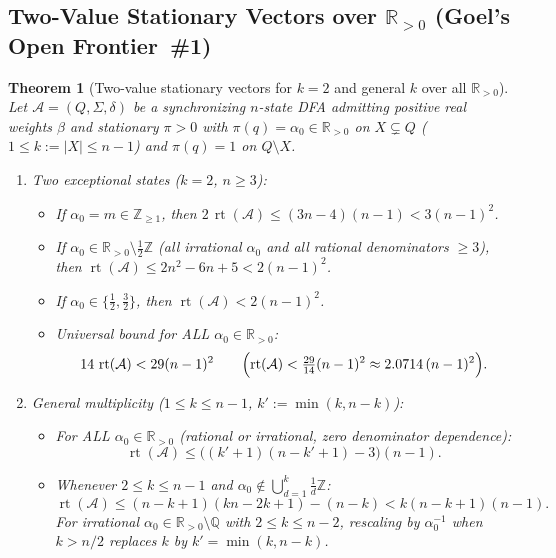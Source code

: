\documentclass[11pt,a4paper]{article}
\newtheorem{theorem}{Theorem}[section]
\theoremstyle{definition}
\theoremstyle{remark}
\newcommand{\rt}{\operatorname{rt}}
\newcommand{\Z}{\mathbb{Z}}
\newcommand{\Q}{\mathbb{Q}}
\newcommand{\R}{\mathbb{R}}
\newcommand{\cA}{\mathcal{A}}
\begin{document}
\subsection{Two-Value Stationary Vectors over \texorpdfstring{$\R_{>0}$}{R>0} (Goel's Open Frontier~\#1)}

\begin{theorem}[Two-value stationary vectors for $k = 2$ and general $k$ over all $\R_{>0}$]
\label{thm:two-value}
Let $\cA = (Q, \Sigma, \delta)$ be a synchronizing $n$-state DFA admitting positive real weights $\beta$ and stationary $\pi > 0$ with $\pi(q) = \alpha_0 \in \R_{>0}$ on $X \subsetneq Q$ ($1 \le k := |X| \le n - 1$) and $\pi(q) = 1$ on $Q \setminus X$.
\begin{enumerate}[label=(\alph*)]
  \item \emph{Two exceptional states ($k = 2$, $n \ge 3$):}
  \begin{itemize}[nosep]
    \item If $\alpha_0 = m \in \Z_{\ge 1}$, then $2\,\rt(\cA) \le (3n - 4)(n - 1) < 3(n - 1)^2$.
    \item If $\alpha_0 \in \R_{>0} \setminus \frac{1}{2}\Z$ (all irrational $\alpha_0$ and all rational denominators $\ge 3$), then $\rt(\cA) \le 2n^2 - 6n + 5 < 2(n - 1)^2$.
    \item If $\alpha_0 \in \{\frac{1}{2}, \frac{3}{2}\}$, then $\rt(\cA) < 2(n - 1)^2$.
    \item \emph{Universal bound for ALL $\alpha_0 \in \R_{>0}$:}
    \[
      14\,\rt(\cA) < 29(n - 1)^2 \qquad \Bigl(\rt(\cA) < \tfrac{29}{14}(n - 1)^2 \approx 2.0714\,(n-1)^2\Bigr).
    \]
  \end{itemize}
  \item \emph{General multiplicity ($1 \le k \le n - 1$, $k' := \min(k, n - k)$):}
  \begin{itemize}[nosep]
    \item For ALL $\alpha_0 \in \R_{>0}$ (rational or irrational, zero denominator dependence):
    \[
      \rt(\cA) \le \bigl((k' + 1)(n - k' + 1) - 3\bigr)(n - 1).
    \]
    \item Whenever $2 \le k \le n - 1$ and $\alpha_0 \notin \bigcup_{d=1}^k \frac{1}{d}\Z$:
    \[
      \rt(\cA) \le (n - k + 1)(kn - 2k + 1) - (n - k) < k(n - k + 1)(n - 1).
    \]
    For irrational $\alpha_0 \in \R_{>0} \setminus \Q$ with $2 \le k \le n - 2$, rescaling by $\alpha_0^{-1}$ when $k > n/2$ replaces $k$ by $k' = \min(k, n - k)$.
  \end{itemize}
\end{enumerate}
\end{theorem}
\end{document}
